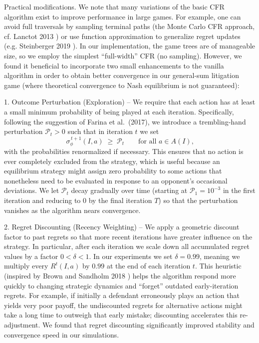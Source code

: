 \documentclass{article}
\begin{document}
Practical modifications. We note that many variations of the basic CFR algorithm exist to improve performance in large games. For example, one can avoid full traversals by sampling terminal paths (the Monte Carlo CFR approach, cf. Lanctot 2013 \cite{lanctot}) or use function approximation to generalize regret updates (e.g. Steinberger 2019 \cite{steinberger}). In our implementation, the game trees are of manageable size, so we employ the simplest “full-width” CFR (no sampling). However, we found it beneficial to incorporate two small enhancements to the vanilla algorithm in order to obtain better convergence in our general-sum litigation game (where theoretical convergence to Nash equilibrium is not guaranteed):

1. Outcome Perturbation (Exploration) – We require that each action has at least a small minimum probability of being played at each iteration.  Specifically, following the suggestion of Farina et al.\ (2017), we introduce a trembling-hand perturbation $\mathcal{P}_t>0$ such that in iteration $t$ we set 
   \[
   \sigma_{\phi}^{\,t+1}(I,a) \;\ge\; \mathcal{P}_t \qquad \text{for all $a \in A(I)$,}
   \] 
   with the probabilities renormalized if necessary.  This ensures that no action is ever completely excluded from the strategy, which is useful because an equilibrium strategy might assign zero probability to some actions that nonetheless need to be evaluated in response to an opponent’s occasional deviations. We let $\mathcal{P}_t$ decay gradually over time (starting at $\mathcal{P}_1 = 10^{-3}$ in the first iteration and reducing to $0$ by the final iteration $T$) so that the perturbation vanishes as the algorithm nears convergence.

2. Regret Discounting (Recency Weighting) – We apply a geometric discount factor to past regrets so that more recent iterations have greater influence on the strategy. In particular, after each iteration we scale down all accumulated regret values by a factor $0<\delta<1$. In our experiments we set $\delta=0.99$, meaning we multiply every $R^t(I,a)$ by $0.99$ at the end of each iteration $t$. This heuristic (inspired by Brown and Sandholm 2018 \cite{brownsandholm}) helps the algorithm respond more quickly to changing strategic dynamics and “forget” outdated early-iteration regrets. For example, if initially a defendant erroneously plays an action that yields very poor payoff, the undiscounted regrets for alternative actions might take a long time to outweigh that early mistake; discounting accelerates this re-adjustment. We found that regret discounting significantly improved stability and convergence speed in our simulations.
\end{document}
